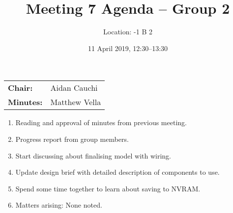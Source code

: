 \documentclass[11pt,a4paper]{article}
\title{Meeting 7 Agenda -- Group 2}
\author{Location: -1 B 2}
\date{11 April 2019, 12:30--13:30}
\begin{document}
\maketitle
\begin{center}
\begin{tabular}{ll}
\textbf{Chair:}   & Aidan Cauchi \\
\textbf{Minutes:} & Matthew Vella
\end{tabular}
\end{center}

\begin{enumerate}

\item Reading and approval of minutes from previous meeting.

\item Progress report from group members.

\item Start discussing about finalising model with wiring.

\item Update design brief with detailed description of components to use.

\item Spend some time together to learn about saving to NVRAM.

\item Matters arising: None noted.

\end{enumerate}
\end{document}
